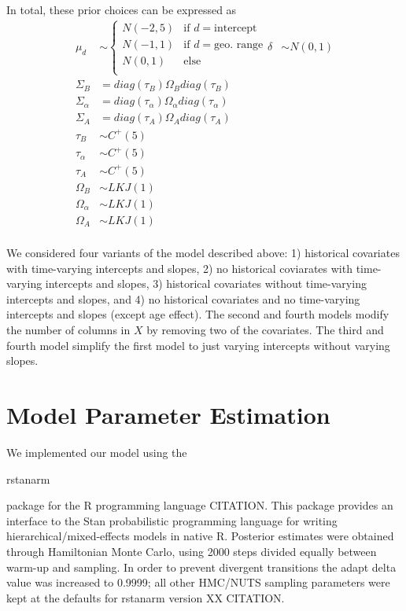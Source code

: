 \documentclass[12pt,letterpaper]{article}
\begin{document}
In total, these prior choices can be expressed as
\begin{equation}
  \begin{aligned}
    \mu_{d} &\sim 
      \begin{cases}
        N(-2, 5) & \text{if } d = \text{intercept} \\
        N(-1, 1) & \text{if } d = \text{geo. range} \\
        N(0, 1) & \text{else } \\
      \end{cases}
    \delta &\sim N(0, 1) \\
    \Sigma_{B} &= diag(\tau_{B}) \Omega_{B} diag(\tau_{B}) \\
    \Sigma_{\alpha} &= diag(\tau_{\alpha}) \Omega_{\alpha} diag(\tau_{\alpha}) \\
    \Sigma_{A} &= diag(\tau_{A}) \Omega_{A} diag(\tau_{A}) \\
    \tau_{B} &\sim C^{+}(5) \\
    \tau_{\alpha} &\sim C^{+}(5) \\
    \tau_{A} &\sim C^{+}(5) \\
    \Omega_{B} &\sim LKJ(1) \\
    \Omega_{\alpha} &\sim LKJ(1) \\
    \Omega_{A} &\sim LKJ(1) \\
  \end{aligned}
  \label{eq:priors}
\end{equation}


We considered four variants of the model described above: 1) historical covariates with time-varying intercepts and slopes, 2) no historical coviarates with time-varying intercepts and slopes, 3) historical covariates without time-varying intercepts and slopes, and 4) no historical covariates and no time-varying intercepts and slopes (except age effect). The second and fourth models modify the number of columns in \(X\) by removing two of the covariates. The third and fourth model simplify the first model to just varying intercepts without varying slopes.


\section{Model Parameter Estimation}

We implemented our model using the \begin{texttt}rstanarm\end{texttt} package for the R programming language CITATION. This package provides an interface to the Stan probabilistic programming language for writing hierarchical/mixed-effects models in native R. Posterior estimates were obtained through Hamiltonian Monte Carlo, using 2000 steps divided equally between warm-up and sampling. In order to prevent divergent transitions the adapt delta value was increased to 0.9999; all other HMC/NUTS sampling parameters were kept at the defaults for rstanarm version XX CITATION. 
\end{document}
